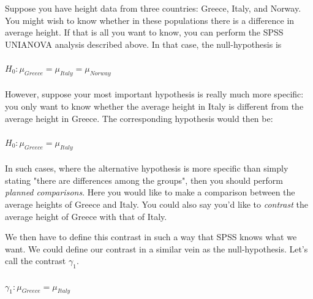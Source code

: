 \documentclass[]{book}\usepackage[]{graphicx}\usepackage[]{color}
\begin{document}
Suppose you have height data from three countries: Greece, Italy, and Norway. You might wish to know whether in these populations there is a difference in average height. If that is all you want to know, you can perform the SPSS UNIANOVA analysis described above. In that case, the null-hypothesis is
\\
\\
$H_0: \mu_{Greece}=\mu_{Italy}=\mu_{Norway}$
\\
\\
However, suppose your most important hypothesis is really much more specific: you only want to know whether the average height in Italy is different from the average height in Greece. The corresponding hypothesis would then be: 
\\
\\
$H_0: \mu_{Greece}=\mu_{Italy}$
\\
\\
In such cases, where the alternative hypothesis is more specific than simply stating "there are differences among the groups", then you should perform \textit{planned comparisons}. Here you would like to make a comparison between the average heights of Greece and Italy. You could also say you'd like to \textit{contrast} the average height of Greece with that of Italy. 

We then have to define this contrast in such a way that SPSS knows what we want. We could define our contrast in a similar vein as the null-hypothesis. Let's call the contrast $\gamma_1$.
\\
\\
$\gamma_1: \mu_{Greece}=\mu_{Italy}$
\\
\\
\end{document}
